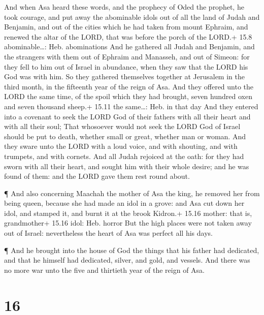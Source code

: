  And when Asa heard these words, and the prophecy of Oded
the prophet, he took courage, and put away the abominable idols out of
all the land of Judah and Benjamin, and out of the cities which he had
taken from mount Ephraim, and renewed the altar of the LORD, that was
before the porch of the LORD.+ 15.8 abominable\ldots: Heb. abominations
 And he gathered all Judah and Benjamin, and the strangers
with them out of Ephraim and Manasseh, and out of Simeon: for they fell
to him out of Israel in abundance, when they saw that the LORD his God
was with him.  So they gathered themselves together at
Jerusalem in the third month, in the fifteenth year of the reign of Asa.
 And they offered unto the LORD the same time, of the spoil
which they had brought, seven hundred oxen and seven thousand sheep.+
15.11 the same\ldots: Heb. in that day  And they entered
into a covenant to seek the LORD God of their fathers with all their
heart and with all their soul;  That whosoever would not
seek the LORD God of Israel should be put to death, whether small or
great, whether man or woman.  And they sware unto the LORD
with a loud voice, and with shouting, and with trumpets, and with
cornets.  And all Judah rejoiced at the oath: for they had
sworn with all their heart, and sought him with their whole desire; and
he was found of them: and the LORD gave them rest round about.

 ¶ And also concerning Maachah the mother of Asa the king,
he removed her from being queen, because she had made an idol in a
grove: and Asa cut down her idol, and stamped it, and burnt it at the
brook Kidron.+ 15.16 mother: that is, grandmother+ 15.16 idol: Heb.
horror  But the high places were not taken away out of
Israel: nevertheless the heart of Asa was perfect all his days.

 ¶ And he brought into the house of God the things that his
father had dedicated, and that he himself had dedicated, silver, and
gold, and vessels.  And there was no more war unto the five
and thirtieth year of the reign of Asa.

\hypertarget{section-15}{%
\section{16}\label{section-15}}

